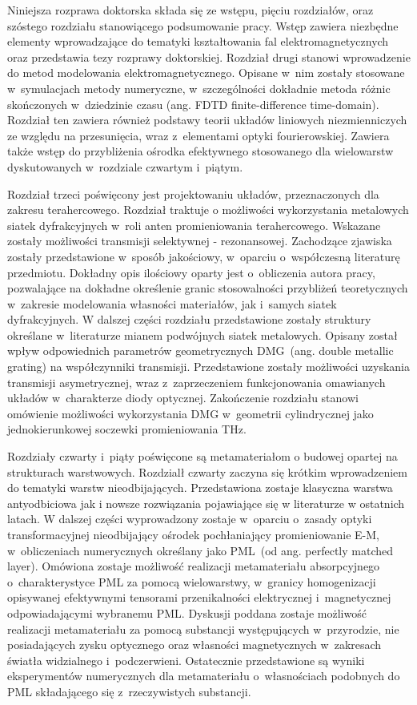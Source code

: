 Niniejsza rozprawa doktorska składa się ze wstępu, pięciu rozdziałów, oraz szóstego rozdziału stanowiącego podsumowanie pracy. Wstęp zawiera niezbędne elementy wprowadzające do tematyki kształtowania fal elektromagnetycznych oraz przedstawia tezy rozprawy doktorskiej. Rozdział drugi stanowi wprowadzenie do metod modelowania elektromagnetycznego. Opisane w~nim zostały stosowane w~symulacjach metody numeryczne, w~szczególności dokładnie metoda różnic skończonych w~dziedzinie czasu (ang. FDTD finite-difference time-domain). Rozdział ten zawiera również podstawy teorii układów liniowych niezmienniczych ze względu na przesunięcia, wraz z~elementami optyki fourierowskiej. Zawiera także wstęp do przybliżenia ośrodka efektywnego stosowanego dla wielowarstw dyskutowanych w~rozdziale czwartym i~piątym.

Rozdział trzeci poświęcony jest projektowaniu układów, przeznaczonych dla zakresu terahercowego. Rozdział traktuje o możliwości wykorzystania metalowych siatek dyfrakcyjnych w~roli anten promieniowania terahercowego. Wskazane zostały możliwości transmisji  selektywnej - rezonansowej. Zachodzące zjawiska zostały przedstawione w~sposób jakościowy, w~oparciu o~współczesną literaturę przedmiotu. Dokładny opis ilościowy oparty jest o~obliczenia autora pracy, pozwalające na dokładne określenie granic stosowalności przybliżeń teoretycznych w~zakresie modelowania własności materiałów, jak i~samych siatek dyfrakcyjnych. W dalszej części rozdziału przedstawione zostały struktury określane w~literaturze mianem podwójnych siatek metalowych. Opisany został wpływ odpowiednich parametrów geometrycznych DMG~(ang. double metallic grating) na współczynniki transmisji. Przedstawione zostały możliwości uzyskania transmisji asymetrycznej, wraz z~zaprzeczeniem funkcjonowania omawianych układów w~charakterze diody optycznej. Zakończenie rozdziału stanowi omówienie możliwości wykorzystania DMG w~geometrii cylindrycznej jako jednokierunkowej soczewki promieniowania THz.

Rozdziały czwarty i~piąty poświęcone są metamateriałom o budowej opartej na strukturach warstwowych. Rozdzialł czwarty zaczyna się krótkim wprowadzeniem do tematyki warstw nieodbijających. Przedstawiona zostaje klasyczna warstwa antyodbiciowa jak i nowsze rozwiązania pojawiające się w literaturze w ostatnich latach. W dalszej części wyprowadzony zostaje w~oparciu o~zasady optyki transformacyjnej nieodbijający ośrodek pochłaniający promieniowanie E-M, w~obliczeniach numerycznych określany jako PML~(od ang. perfectly matched layer). Omówiona zostaje możliwość realizacji metamateriału absorpcyjnego o~charakterystyce PML za pomocą wielowarstwy, w~granicy homogenizacji opisywanej efektywnymi tensorami przenikalności elektrycznej i~magnetycznej odpowiadającymi wybranemu PML. Dyskusji poddana zostaje możliwość realizacji metamateriału za pomocą substancji występujących w~przyrodzie, nie posiadających zysku optycznego oraz własności magnetycznych w~zakresach światła widzialnego i~podczerwieni. Ostatecznie przedstawione są wyniki eksperymentów numerycznych dla metamateriału o~własnościach podobnych do PML składającego się z~rzeczywistych substancji.

